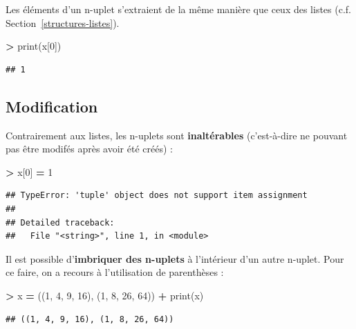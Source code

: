 \documentclass[12pt,]{book}
\newenvironment{Shaded}{\begin{snugshade}}{\end{snugshade}}
\newcommand{\DecValTok}[1]{\textcolor[rgb]{0.00,0.00,0.81}{#1}}
\newcommand{\OperatorTok}[1]{\textcolor[rgb]{0.81,0.36,0.00}{\textbf{#1}}}
\newcommand{\BuiltInTok}[1]{#1}
\newcommand{\NormalTok}[1]{#1}
\numberwithin{equation}{section}
\numberwithin{countremarque}{section}
\begin{document}
Les éléments d'un n-uplet s'extraient de la même manière que ceux des
listes (c.f. Section~\ref{structures-listes}).

\begin{Shaded}
\begin{Highlighting}[]
\OperatorTok{>} \BuiltInTok{print}\NormalTok{(x[}\DecValTok{0}\NormalTok{])}
\end{Highlighting}
\end{Shaded}

\begin{lstlisting}
## 1
\end{lstlisting}

\subsection{Modification}\label{modification-1}

Contrairement aux listes, les n-uplets sont \textbf{inaltérables}
(c'est-à-dire ne pouvant pas être modifés après avoir été créés) :

\begin{Shaded}
\begin{Highlighting}[]
\OperatorTok{>}\NormalTok{ x[}\DecValTok{0}\NormalTok{] }\OperatorTok{=} \DecValTok{1}
\end{Highlighting}
\end{Shaded}

\begin{lstlisting}
## TypeError: 'tuple' object does not support item assignment
## 
## Detailed traceback: 
##   File "<string>", line 1, in <module>
\end{lstlisting}

Il est possible d'\textbf{imbriquer des n-uplets} à l'intérieur d'un
autre n-uplet. Pour ce faire, on a recours à l'utilisation de
parenthèses :

\begin{Shaded}
\begin{Highlighting}[]
\OperatorTok{>}\NormalTok{ x }\OperatorTok{=}\NormalTok{ ((}\DecValTok{1}\NormalTok{, }\DecValTok{4}\NormalTok{, }\DecValTok{9}\NormalTok{, }\DecValTok{16}\NormalTok{), (}\DecValTok{1}\NormalTok{, }\DecValTok{8}\NormalTok{, }\DecValTok{26}\NormalTok{, }\DecValTok{64}\NormalTok{))}
\OperatorTok{+} \BuiltInTok{print}\NormalTok{(x)}
\end{Highlighting}
\end{Shaded}

\begin{lstlisting}
## ((1, 4, 9, 16), (1, 8, 26, 64))
\end{lstlisting}
\end{document}
